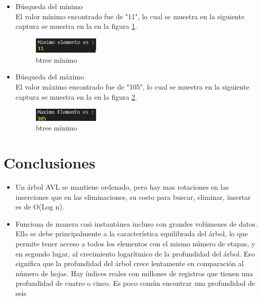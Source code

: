 \documentclass{article}
\begin{document}
\begin{itemize}
 
            \item Búsqueda del mínimo \\
            El valor mínimo encontrado fue de "11", lo cual se muestra en la siguiente captura  se muestra en la en la figura \ref{fig:btree_min}.
            \begin{figure}[htbp]
              \centering
              \includegraphics[width=0.3\textwidth]{img/btree_min.png}
              \caption{btree mínimo}
              \label{fig:btree_min}
            \end{figure} 
            \item Búsqueda del máximo \\
                El valor máximo encontrado fue de "105", lo cual se muestra en la siguiente captura  se muestra en la en la figura \ref{fig:btree_max}.
            \begin{figure}[htbp]
              \centering
              \includegraphics[width=0.3\textwidth]{img/btree_max.png}
              \caption{btree mínimo}
              \label{fig:btree_max}
            \end{figure} 
        \end{itemize}
  

    \section{Conclusiones}
        \begin{itemize}
                 \item Un árbol AVL se mantiene ordenado, pero hay mas rotaciones en las inserciones que en las eliminaciones, su costo para buscar, eliminar, insertar  es de O(Log n).
                 \item Funciona de manera casi instantánea incluso con grandes volúmenes de datos. Ello se debe principalmente a la característica equilibrada del árbol, lo que permite tener acceso a todos los elementos con el mismo número de etapas, y en segundo lugar, al crecimiento logarítmico de la profundidad del árbol. Eso significa que la profundidad del árbol crece lentamente en comparación al número de hojas. Hay índices reales con millones de registros que tienen una profundidad de cuatro o cinco. Es poco común encontrar una profundidad de seis
        \end{itemize}
\end{document}
